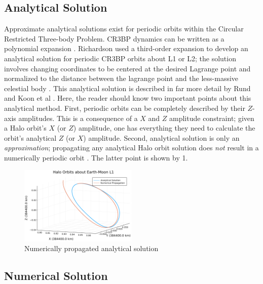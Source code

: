 \documentclass[conf]{new-aiaa}
\begin{document}
\begin{multicols}{2}
\subsection{Analytical Solution}
Approximate analytical solutions exist for periodic orbits within
the Circular Restricted Three-body Problem. CR3BP dynamics can 
be written as a polynomial expansion 
\cite{koon2008dynamical}. 
Richardson used a third-order expansion to develop an 
analytical solution for periodic CR3BP orbits about L1 or L2;
the solution involves changing coordinates to be centered 
at the desired Lagrange point and normalized to the 
distance between the lagrange point and the less-massive 
celestial body 
\cite{koon2008dynamical} 
\cite{richardson1980analytical}
\cite{rund2018interplanetary}.
This analytical solution is described in far more detail 
by Rund and Koon et al 
\cite{rund2018interplanetary} 
\cite{koon2008dynamical}.
Here, the reader should know two important points 
about this analytical method. First, periodic orbits
can be completely described by their $Z$-axis amplitudes.
This is a consequence of a $X$ and $Z$ amplitude constraint;
given a Halo orbit's $X$ (or $Z$) amplitude, one has everything
they need to calculate the orbit's analytical $Z$ (or $X$) 
amplitude. Second, analytical solution is only 
an \textit{approximation}; propagating any 
analytical Halo orbit solution does \textit{not} result 
in a numerically periodic orbit
\cite{koon2008dynamical}.
The latter point is shown by \figurename{1}.

\vskip -0.3cm
\begin{figure}[H]
    \hskip -0.3cm
    \includegraphics[width=0.5\textwidth]{analytical_propagation.png}
    \caption{Numerically propagated analytical solution}
\end{figure}

\subsection{Numerical Solution}


\end{multicols}
\end{document}

